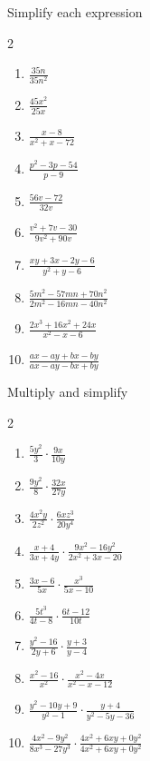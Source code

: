 \documentclass[12pt]{article}
\newenvironment{problem}[2][Problem]{\begin{trivlist}
\item[\hskip \labelsep {\bfseries #1}\hskip \labelsep {\bfseries #2.}]}{\end{trivlist}}
\newenvironment{sol}
    {\emph{Solution:}
    }
    {
    \qed
    }
\begin{document}


\begin{problem}{1}
  Simplify each expression
\begin{multicols}{2}
  \begin{enumerate}[label=\roman*)]
  \item  $ \frac{35n}{35n^2}$
  \item $\frac{45x^2}{25x}$
  \item $ \frac{x-8}{x^2+x-72}$
  \item $\frac{p^2-3p-54}{p-9}$
  \item $\frac{56v-72}{32v}$
  \item $\frac{v^2+7v-30}{9v^2+90v}$
  \item $\frac{xy+3x-2y-6}{y^2+y-6}$
  \item $\frac{5m^2-57mn+70n^2}{2m^2-16mn-40n^2}$
    \item $\frac{2x^3+16x^2+24x}{x^2-x-6}$
  \item $\frac{ax-ay+bx-by}{ax-ay-bx+by}$
  \end{enumerate}
\end{multicols}
\end{problem}



\begin{problem}{2}
  Multiply and simplify
\begin{multicols}{2}
  \begin{enumerate}[label=\roman*)]
  \item $ \frac{5y^2}{3}\cdot\frac{9x}{10y}$
  \item $\frac{9y^2}{8}\cdot\frac{32x}{27y}$
  \item $\frac{4x^2y}{2z^2}\cdot\frac{6xz^3}{20y^4}$
  \item $\frac{x+4}{3x+4y}\cdot\frac{9x^2-16y^2}{2x^2+3x-20}$
  \item $\frac{3x-6}{5x}\cdot\frac{x^3}{5x-10}$
  \item $\frac{5t^3}{4t-8}\cdot\frac{6t-12}{10t}$
  \item $\frac{y^2-16}{2y+6}\cdot\frac{y+3}{y-4}$
  \item $\frac{x^2-16}{x^2}\cdot\frac{x^2-4x}{x^2-x-12}$
  \item $\frac{y^2-10y+9}{y^2-1}\cdot\frac{y+4}{y^2-5y-36}$
  \item $\frac{4x^2-9y^2}{8x^3-27y^3}\cdot\frac{4x^2+6xy+0y^2}{4x^2+6xy+0y^2}$
  \end{enumerate}
\end{multicols}
\end{problem}
\end{document}
